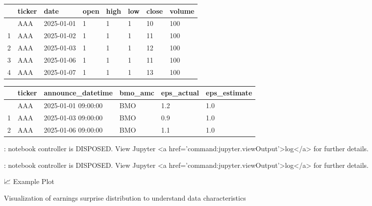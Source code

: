 \documentclass[
  letterpaper,
  DIV=11,
  numbers=noendperiod]{scrartcl}
\begin{document}
\begin{longtable}[]{@{}llllllll@{}}
\toprule\noalign{}
& ticker & date & open & high & low & close & volume \\
\midrule\noalign{}
\endhead
\bottomrule\noalign{}
\endlastfoot
0 & AAA & 2025-01-01 & 1 & 1 & 1 & 10 & 100 \\
1 & AAA & 2025-01-02 & 1 & 1 & 1 & 11 & 100 \\
2 & AAA & 2025-01-03 & 1 & 1 & 1 & 12 & 100 \\
3 & AAA & 2025-01-06 & 1 & 1 & 1 & 11 & 100 \\
4 & AAA & 2025-01-07 & 1 & 1 & 1 & 13 & 100 \\
\end{longtable}

\begin{longtable}[]{@{}llllll@{}}
\toprule\noalign{}
& ticker & announce\_datetime & bmo\_amc & eps\_actual &
eps\_estimate \\
\midrule\noalign{}
\endhead
\bottomrule\noalign{}
\endlastfoot
0 & AAA & 2025-01-01 09:00:00 & BMO & 1.2 & 1.0 \\
1 & AAA & 2025-01-03 09:00:00 & BMO & 0.9 & 1.0 \\
2 & AAA & 2025-01-06 09:00:00 & BMO & 1.1 & 1.0 \\
\end{longtable}

\begin{Highlighting}
\textcolor{black}{: }
\textcolor{black}{}\textcolor{QuartoInternalColor1}{notebook controller is DISPOSED. }
\textcolor{QuartoInternalColor1}{}\textcolor{QuartoInternalColor1}{View Jupyter <a href='command:jupyter.viewOutput'>log</a> for further details.}
\end{Highlighting}

\begin{Highlighting}
\textcolor{black}{: }
\textcolor{black}{}\textcolor{QuartoInternalColor1}{notebook controller is DISPOSED. }
\textcolor{QuartoInternalColor1}{}\textcolor{QuartoInternalColor1}{View Jupyter <a href='command:jupyter.viewOutput'>log</a> for further details.}
\end{Highlighting}

📈 Example Plot

Visualization of earnings surprise distribution to understand data
characteristics
\end{document}
